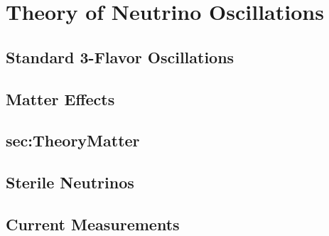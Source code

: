 \chapter{Theory of Neutrino Oscillations}
\label{ch:Theory}

\section{Standard 3-Flavor Oscillations}
\label{sec:Theory3}

\section{Matter Effects}
\section{sec:TheoryMatter}

\section{Sterile Neutrinos}
\label{sec:Theory3+1}

\section{Current Measurements}
\label{sec:BestMeasures}